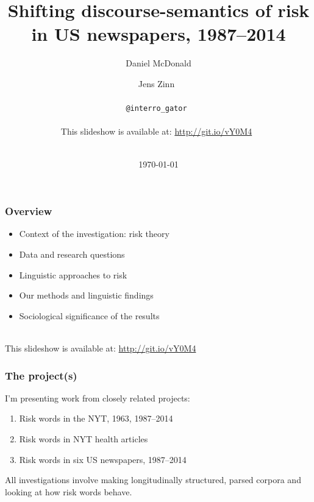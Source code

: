 \documentclass{beamer}       %
\title[FEAST]{Shifting discourse-semantics of risk in US newspapers, 1987--2014}
\author[McDonald \& Zinn]{Daniel McDonald \and Jens Zinn~\\~\\\texttt{@interro\_gator}~\\~\\This slideshow is available at: \url{http://git.io/vY0M4}~\\~\\}
\date{\today}
\begin{document}

\frame{\titlepage}


\begin{frame}
    \frametitle{Overview}
    
    \begin{itemize}
    \item Context of the investigation: risk theory
    \item Data and research questions
    \item Linguistic approaches to risk
    \item Our methods and linguistic findings
    \item Sociological significance of the results
    \end{itemize}

    ~\\ This slideshow is available at: \url{http://git.io/vY0M4}

\end{frame}

\begin{frame}\frametitle{The project(s)}

I'm presenting work from closely related projects:

\begin{enumerate}
    \item Risk words in the NYT, 1963, 1987--2014
    \item Risk words in NYT health articles
    \item Risk words in six US newspapers, 1987--2014
\end{enumerate}

All investigations involve making longitudinally structured, parsed corpora and looking at how risk words behave.

\end{frame}
\end{document}

